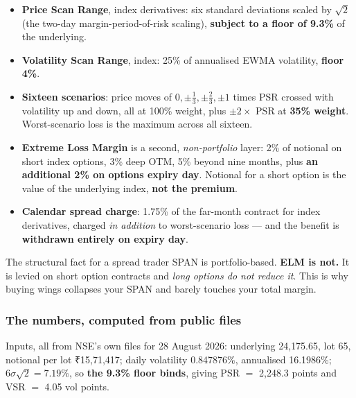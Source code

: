 \documentclass[11pt,a4paper]{article}
\newcommand{\rs}{₹}
\begin{document}
\begin{itemize}
\item \textbf{Price Scan Range}, index derivatives: six standard deviations scaled
by $\sqrt{2}$ (the two-day margin-period-of-risk scaling), \textbf{subject to a
floor of 9.3\%} of the underlying.
\item \textbf{Volatility Scan Range}, index: 25\% of annualised EWMA volatility,
\textbf{floor 4\%}.
\item \textbf{Sixteen scenarios}: price moves of $0, \pm\tfrac13, \pm\tfrac23,
\pm1$ times PSR crossed with volatility up and down, all at 100\% weight, plus
$\pm 2 \times$ PSR at \textbf{35\% weight}. Worst-scenario loss is the maximum
across all sixteen.
\item \textbf{Extreme Loss Margin} is a second, \emph{non-portfolio} layer: 2\% of
notional on short index options, 3\% deep OTM, 5\% beyond nine months, plus
\textbf{an additional 2\% on options expiry day}. Notional for a short option is
the value of the underlying index, \textbf{not the premium}.
\item \textbf{Calendar spread charge}: 1.75\% of the far-month contract for index
derivatives, charged \emph{in addition} to worst-scenario loss --- and the benefit
is \textbf{withdrawn entirely on expiry day}.
\end{itemize}

\begin{keyfact}{The structural fact for a spread trader}
SPAN is portfolio-based. \textbf{ELM is not.} It is levied on short option
contracts and \emph{long options do not reduce it}. This is why buying wings
collapses your SPAN and barely touches your total margin.
\end{keyfact}

\subsubsection{The numbers, computed from public files}

Inputs, all from NSE's own files for 28 August 2026: underlying 24{,}175.65, lot
65, notional per lot \rs 15{,}71{,}417; daily volatility 0.847876\%, annualised
16.1986\%; $6\sigma\sqrt{2} = 7.19\%$, so \textbf{the 9.3\% floor binds}, giving
PSR $=$ 2{,}248.3 points and VSR $=$ 4.05 vol points.
\end{document}
